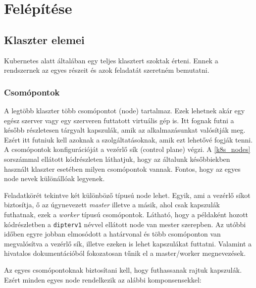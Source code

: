 \section{Felépítése}

\subsection{Klaszter elemei}
Kubernetes alatt általában egy teljes klasztert szoktak érteni. Ennek a rendszernek az egyes részeit és azok feladatát szeretném bemutatni.  

\subsubsection{Csomópontok}
A legtöbb klaszter több csomópontot (node) tartalmaz. Ezek lehetnek akár egy egész szerver vagy egy szerveren futtatott virtuális gép is. Itt fognak futni a később részletesen tárgyalt kapszulák, amik az alkalmazásunkat valósítják meg. Ezért itt futniuk kell azoknak a szolgáltatásoknak, amik ezt lehetővé fogják tenni. A csomópontok konfigurációját a vezérlő sík (control plane) végzi. A \ref{k8s_nodes} sorszámmal ellátott kódrészleten láthatjuk, hogy az általunk későbbiekben használt klaszter esetében milyen csomópontok vannak. Fontos, hogy az egyes node nevek  különállóak legyenek. 

Feladatkörét tekintve két különböző típusú node lehet. Egyik, ami a vezérlő síkot biztosítja, ő az úgynevezett \textit{master} illetve a másik, ahol csak kapszulák futhatnak, ezek a \textit{worker} típusú csomópontok. Látható, hogy a példaként hozott kódrészletben a \verb+dipterv1+ névvel ellátott node van mester szerepben. Az utóbbi időben egyre jobban elmosódott a határvonal és több csomóponton van megvalósítva a vezérlő sík, illetve ezeken is lehet kapszulákat futtatni. Valamint a hivatalos dokumentációból fokozatosan tűnik el a master/worker megnevezések.\\

\lstset{caption=Később használt klaszter csomópontjai, label=k8s_nodes}


Az egyes csomópontoknak biztosítani kell, hogy futhassanak rajtuk kapszulák. Ezért minden egyes node rendelkezik az alábbi komponsensekkel:


